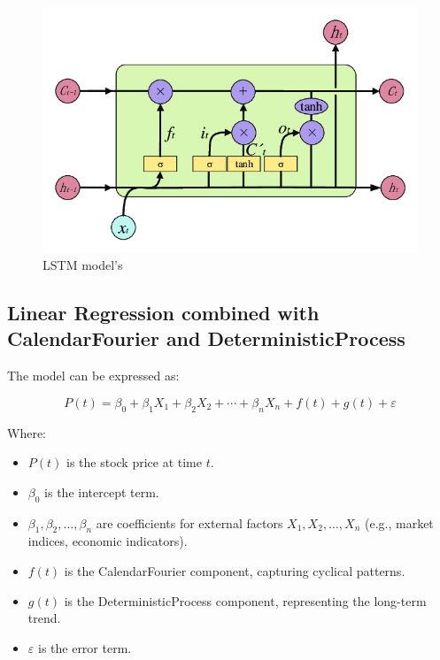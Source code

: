 \documentclass{ieeeojies}
\begin{document}
\begin{figure}[H]
  \centering
  \begin{minipage}{0.8\linewidth}
    \centering
    \includegraphics[width=\linewidth]{bibliography/Figure/LSTM_model.png}
    \caption{LSTM model's}
    \label{fig8}
  \end{minipage}
\end{figure}

\subsection{Linear Regression combined with CalendarFourier and DeterministicProcess }

The model can be expressed as:

\begin{equation}
P(t) = \beta_0 + \beta_1X_1 + \beta_2X_2 + \cdots + \beta_nX_n + f(t) + g(t) + \varepsilon
\end{equation}

Where:
\begin{itemize}
    \item $P(t)$ is the stock price at time $t$.
    \item $\beta_0$ is the intercept term.
    \item $\beta_1, \beta_2, \ldots, \beta_n$ are coefficients for external factors $X_1, X_2, \ldots, X_n$ (e.g., market indices, economic indicators).
    \item $f(t)$ is the CalendarFourier component, capturing cyclical patterns.
    \item $g(t)$ is the DeterministicProcess component, representing the long-term trend.
    \item $\varepsilon$ is the error term.
\end{itemize}
\end{document}
